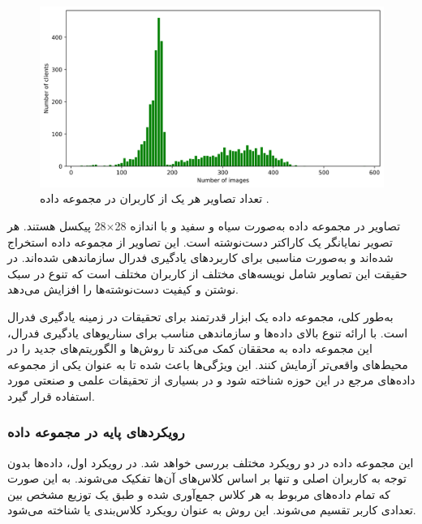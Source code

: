 \begin{figure}[t!]
	\centering
	\includegraphics[scale=0.7]{images/chap5/clients_images.png}%
	\caption{%
		تعداد تصاویر هر یک از کاربران در مجموعه داده
		.
	}
	\label{clients_images}
	\centering
\end{figure}



تصاویر در مجموعه داده
به‌صورت سیاه و سفید و با اندازه
28$\times$28
پیکسل هستند. هر تصویر نمایانگر یک کاراکتر دست‌نوشته است. این تصاویر از مجموعه داده
استخراج شده‌اند و به‌صورت مناسبی برای کاربردهای یادگیری فدرال سازماندهی شده‌اند. در حقیقت این تصاویر شامل نویسه‌های مختلف از کاربران مختلف است که تنوع در سبک نوشتن و کیفیت دست‌نوشته‌ها را افزایش می‌دهد.


به‌طور کلی، مجموعه داده
یک ابزار قدرتمند برای تحقیقات در زمینه یادگیری فدرال است. با ارائه تنوع بالای داده‌ها و سازماندهی مناسب برای سناریوهای یادگیری فدرال، این مجموعه داده به محققان کمک می‌کند تا روش‌ها و الگوریتم‌های جدید را در محیط‌های واقعی‌تر آزمایش کنند. این ویژگی‌ها باعث شده تا
به عنوان یکی از مجموعه داده‌های مرجع در این حوزه شناخته شود و در بسیاری از تحقیقات علمی و صنعتی مورد استفاده قرار گیرد.



\vspace{3mm}
\subsubsection{
	رویکردهای پایه در مجموعه داده
}\vspace{-1mm}


این مجموعه داده در دو رویکرد مختلف بررسی خواهد شد. در رویکرد اول، داده‌ها بدون توجه به کاربران اصلی و تنها بر اساس کلاس‌های آن‌ها تفکیک می‌شوند. به این صورت که تمام داده‌های مربوط به هر کلاس جمع‌آوری شده و طبق یک توزیع مشخص بین تعدادی کاربر تقسیم می‌شوند. این روش به عنوان رویکرد کلاس‌بندی یا
شناخته می‌شود.

